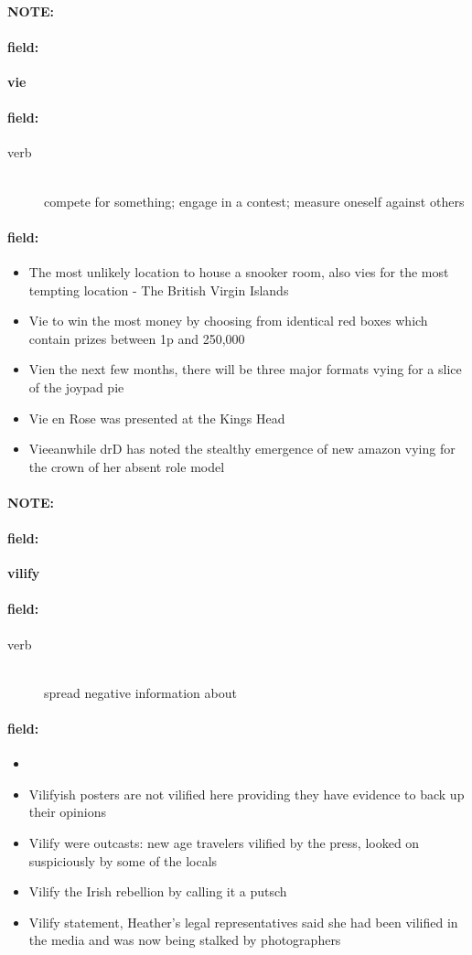 \documentclass[12pt]{article}
\newenvironment{note}{\paragraph{NOTE:}}{}
\newenvironment{field}{\paragraph{field:}}{}
\begin{document}
\begin{note}
\begin{field}
\textbf{\large vie}
\end{field}


\begin{field}
\begin{description}
\item[verb] \hfill \\ 
compete for something; engage in a contest; measure oneself against others

\end{description}
\end{field}

\begin{field}
\begin{itemize}
\item The most unlikely location to house a snooker room, also vies for the most tempting location - The British Virgin Islands
\item Vie to win the most money by choosing from identical red boxes which contain prizes between 1p and  250,000
\item Vien the next few months, there will be three major formats vying for a slice of the joypad pie
\item Vie en Rose was presented at the Kings Head
\item Vieeanwhile drD has noted the stealthy emergence of new amazon vying for the crown of her absent role model
\end{itemize}
\end{field}
\end{note}
\begin{note}
\begin{field}
\textbf{\large vilify}
\end{field}


\begin{field}
\begin{description}
\item[verb] \hfill \\ 
spread negative information about

\end{description}
\end{field}

\begin{field}
\begin{itemize}
\item 
\item Vilifyish posters are not vilified here providing they have evidence to back up their opinions
\item Vilify were outcasts: new age travelers vilified by the press, looked on suspiciously by some of the locals
\item Vilify the Irish rebellion by calling it a putsch 
\item Vilify statement, Heather's legal representatives said she had been vilified in the media and was now being stalked by photographers
\end{itemize}
\end{field}
\end{note}
\end{document}
